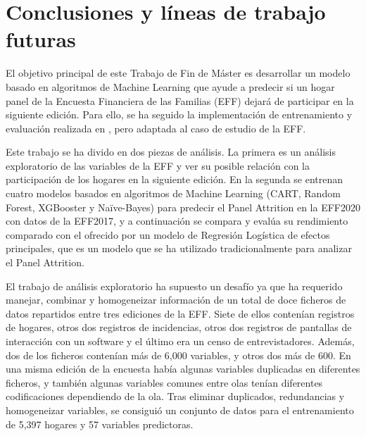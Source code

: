 \chapter{Conclusiones y líneas de trabajo futuras}
\label{chapter:conclusiones}

El objetivo principal de este Trabajo de Fin de Máster es desarrollar un modelo basado en algoritmos de Machine Learning que ayude a predecir si un hogar panel de la Encuesta Financiera de las Familias (EFF) dejará de participar en la siguiente edición. Para ello, se ha seguido la implementación de entrenamiento y evaluación realizada en \cite{beste2023case}, pero adaptada al caso de estudio de la EFF.

Este trabajo se ha divido en dos piezas de análisis. La primera es un análisis exploratorio de las variables de la EFF y ver su posible relación con la participación de los hogares en la siguiente edición. En la segunda se entrenan cuatro modelos basados en algoritmos de Machine Learning (CART, Random Forest, XGBooster y Naïve-Bayes) para predecir el Panel Attrition en la EFF2020 con datos de la EFF2017, y a continuación se compara y evalúa su rendimiento comparado con el ofrecido por un modelo de Regresión Logística de efectos principales, que es un modelo que se ha utilizado tradicionalmente para analizar el Panel Attrition.

El trabajo de análisis exploratorio ha supuesto un desafío ya que ha requerido manejar, combinar y homogeneizar información de un total de doce ficheros de datos repartidos entre tres ediciones de la EFF. Siete de ellos contenían registros de hogares, otros dos registros de incidencias, otros dos registros de pantallas de interacción con un software y el último era un censo de entrevistadores. Además, dos de los ficheros contenían más de 6,000 variables, y otros dos más de 600. En una misma edición de la encuesta había algunas variables duplicadas en diferentes ficheros, y también algunas variables comunes entre olas tenían diferentes codificaciones dependiendo de la ola. Tras eliminar duplicados, redundancias y homogeneizar variables, se consiguió un conjunto de datos para el entrenamiento de 5,397 hogares y 57 variables predictoras.

